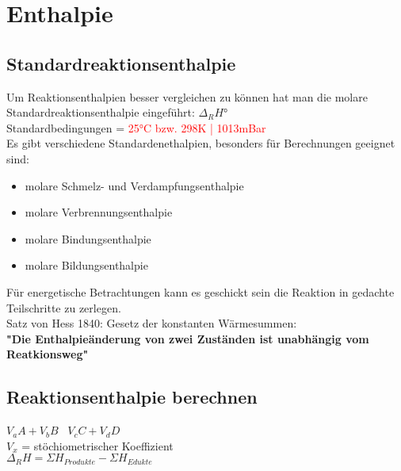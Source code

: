 \section{Enthalpie} \label{sec:enthalpie}

\subsection{Standardreaktionsenthalpie}
Um Reaktionsenthalpien besser vergleichen zu können hat man die molare Standardreaktionsenthalpie eingeführt: $\Delta_RH°$ \\
Standardbedingungen = \textcolor{red}{25°C bzw. 298K | 1013mBar} \\
Es gibt verschiedene Standardenethalpien, besonders für Berechnungen geeignet sind:
\begin{itemize}
    \item molare Schmelz- und Verdampfungsenthalpie
    \item molare Verbrennungsenthalpie
    \item molare Bindungsenthalpie
    \item molare Bildungsenthalpie
\end{itemize}
Für energetische Betrachtungen kann es geschickt sein die Reaktion in gedachte Teilschritte zu zerlegen. \\
Satz von Hess 1840: Gesetz der konstanten Wärmesummen: \\ 
\textbf{"Die Enthalpieänderung von zwei Zuständen ist unabhängig vom Reatkionsweg"}

\subsection{Reaktionsenthalpie berechnen}
$V_aA + V_bB$ \textrightarrow\ $V_cC + V_dD$ \\
$V_x$ = stöchiometrischer Koeffizient \\
$\Delta_RH = \Sigma H_{Produkte} - \Sigma H_{Edukte}$

